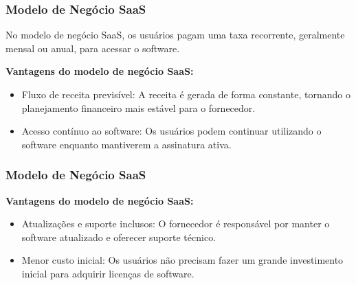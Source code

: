 \documentclass{beamer}
\begin{document}
\begin{frame}
	\frametitle{Modelo de Negócio SaaS}

	No modelo de negócio SaaS, os usuários pagam uma taxa recorrente, geralmente mensal ou anual, para acessar o software.

	\textbf{Vantagens do modelo de negócio SaaS:}

	\begin{itemize}
		\item Fluxo de receita previsível: A receita é gerada de forma constante, tornando o planejamento financeiro mais estável para o fornecedor.
		\item Acesso contínuo ao software: Os usuários podem continuar utilizando o software enquanto mantiverem a assinatura ativa.
	\end{itemize}
\end{frame}
\begin{frame}
	\frametitle{Modelo de Negócio SaaS}

	\textbf{Vantagens do modelo de negócio SaaS:}

	\begin{itemize}
		\item Atualizações e suporte inclusos: O fornecedor é responsável por manter o software atualizado e oferecer suporte técnico.
		\item Menor custo inicial: Os usuários não precisam fazer um grande investimento inicial para adquirir licenças de software.
	\end{itemize}


\end{frame}
\end{document}
